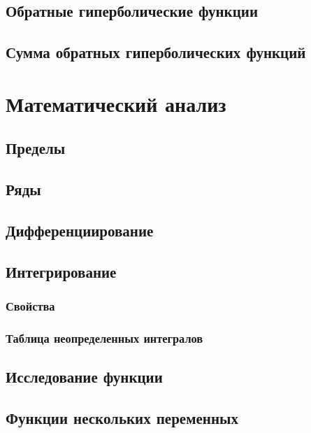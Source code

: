\subsection{Обратные гиперболические функции}

\subsection{Сумма обратных гиперболических функций}


\section{Математический анализ}

\subsection{Пределы}

\subsection{Ряды}

\subsection{Дифференциирование}

\subsection{Интегрирование}

\subsubsection{Свойства}

\subsubsection{Таблица неопределенных интегралов}

\subsection{Исследование функции}

\subsection{Функции нескольких переменных}

